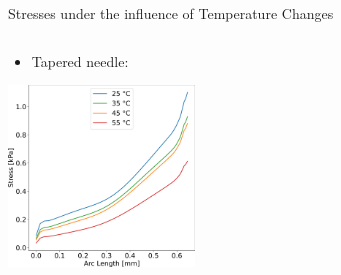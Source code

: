 \begin{frame}{Stresses under the influence of Temperature Changes}
\begin{columns}
\begin{column}{.333\textwidth}
\begin{itemize}
    \item Tapered needle:
\end{itemize}
\vspace{0.5mm}
\centering
\includegraphics[trim = 0mm 0mm 0mm 0mm, clip, width=1.95in]{./images/tapered_ssdata_sphere.png}
\end{column}
\end{columns}

\end{frame}

